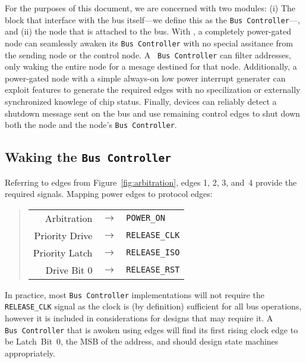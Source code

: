 For the purposes of this document, we are concerned with two modules: (i) The
block that interface with the bus itself---we define this as the {\tt Bus
Controller}---, and (ii) the node that is attached to the bus. With \bus, a
completely power-gated node can seamlessly awaken its {\tt Bus~Controller}
with no special assitance from the sending node or the control node. A {\tt
Bus~Controller} can filter addresses, only waking the entire node for a mesage
destined for that node. Additionally, a power-gated node with a simple
always-on low power interrupt generater can exploit \bus features to generate
the required edges with no specilization or externally synchronized knowlege
of chip status. Finally, devices can reliably detect a shutdown message sent
on the bus and use remaining control edges to shut down both the node and the
node's {\tt Bus~Controller}.

\subsection{Waking the \texttt{Bus~Controller}}
\label{sec:power-bus-controller-wakeup}
Referring to edges from Figure~\ref{fig:arbitration}, edges 1, 2, 3, and~4
provide the required signals. Mapping power edges to \bus protocol edges:

\begin{quote}
\begin{tabular}{r c l}
  Arbitration    & $\rightarrow$ & {\tt POWER\_ON} \\
  Priority Drive & $\rightarrow$ & {\tt RELEASE\_CLK} \\
  Priority Latch & $\rightarrow$ & {\tt RELEASE\_ISO} \\
  Drive Bit 0    & $\rightarrow$ & {\tt RELEASE\_RST} \\
\end{tabular}
\end{quote}

In practice, most {\tt Bus~Controller} implementations will not require the
{\tt RELEASE\_CLK} signal as the \bus clock is (by definition) sufficient for
all bus operations, however it is included in considerations for designs that
may require it. A {\tt Bus~Controller} that is awoken using \bus edges will
find its first rising clock edge to be Latch~Bit~0, the MSB of the address,
and should design state machines appropriately.

